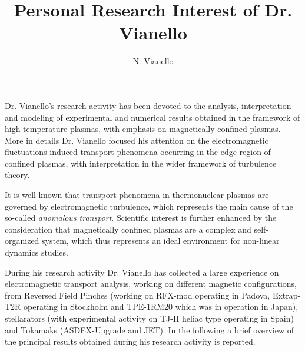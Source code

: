 \documentclass[12pt,a4paper]{article}
\title{Personal Research Interest of Dr. Vianello}
\author{%
   \vspace{10pt}
	N. Vianello\\
	\vspace{20pt}
	}
\makeatletter
\def\printtitle{%
    {\color{bl} \centering \huge \sc \textbf{\@title}\par}}		%
\def\printauthor{%
    {\centering \small \@author}}				%
\makeatother
\begin{document}
\printtitle 

\printauthor


Dr. Vianello's research activity has been devoted to the analysis,
interpretation and modeling of experimental and numerical results
obtained in the framework of high temperature plasmas, with emphasis
on magnetically confined plasmas. More in details Dr. Vianello focused
his attention on the electromagnetic fluctuations induced transport
phenomena occurring in the edge region of confined plasmas, 
with interpretation in the wider framework of turbulence
theory. 

It is well known that transport phenomena in thermonuclear plasmas are
governed by electromagnetic turbulence, which represents the main
cause of the so-called \emph{anomalous transport}. Scientific interest
is further enhanced by the consideration that magnetically confined
plasmas are a complex and self-organized system, which thus represents
an ideal environment for non-linear dynamics studies.

During his research activity Dr. Vianello has collected a large experience on
electromagnetic transport analysis, working on different
magnetic configurations, from Reversed Field Pinches (working on
RFX-mod operating in Padova, Extrap-T2R operating in Stockholm and
TPE-1RM20 which was in operation in Japan), stellarators (with
experimental activity on TJ-II heliac type operating in Spain) and Tokamaks
(ASDEX-Upgrade and JET). 
In the following a brief overview of the principal results obtained
during his research activity is reported.
\end{document}
